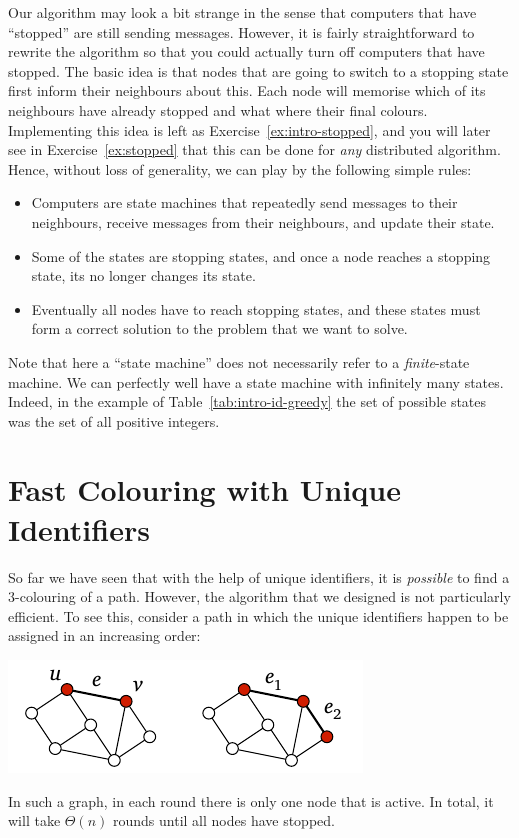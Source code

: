 Our algorithm may look a bit strange in the sense that computers that have ``stopped'' are still sending messages. However, it is fairly straightforward to rewrite the algorithm so that you could actually turn off computers that have stopped. The basic idea is that nodes that are going to switch to a stopping state first inform their neighbours about this. Each node will memorise which of its neighbours have already stopped and what where their final colours. Implementing this idea is left as Exercise~\ref{ex:intro-stopped}, and you will later see in Exercise~\ref{ex:stopped} that this can be done for \emph{any} distributed algorithm. Hence, without loss of generality, we can play by the following simple rules:
\begin{itemize}
    \item Computers are state machines that repeatedly send messages to their neighbours, receive messages from their neighbours, and update their state.
    \item Some of the states are stopping states, and once a node reaches a stopping state, its no longer changes its state.
    \item Eventually all nodes have to reach stopping states, and these states must form a correct solution to the problem that we want to solve.
\end{itemize}
Note that here a ``state machine'' does not necessarily refer to a \emph{finite}-state machine. We can perfectly well have a state machine with infinitely many states. Indeed, in the example of Table~\ref{tab:intro-id-greedy} the set of possible states was the set of all positive integers.


\section{Fast Colouring with Unique Identifiers}\label{sec:intro-pos-id-fast}

So far we have seen that with the help of unique identifiers, it is \emph{possible} to find a $3$-colouring of a path. However, the algorithm that we designed is not particularly efficient. To see this, consider a path in which the unique identifiers happen to be assigned in an increasing order:
\begin{center}
    \includegraphics[page=\PIntroIdBad]{figs.pdf}
\end{center}
In such a graph, in each round there is only one node that is active. In total, it will take $\Theta(n)$ rounds until all nodes have stopped.

